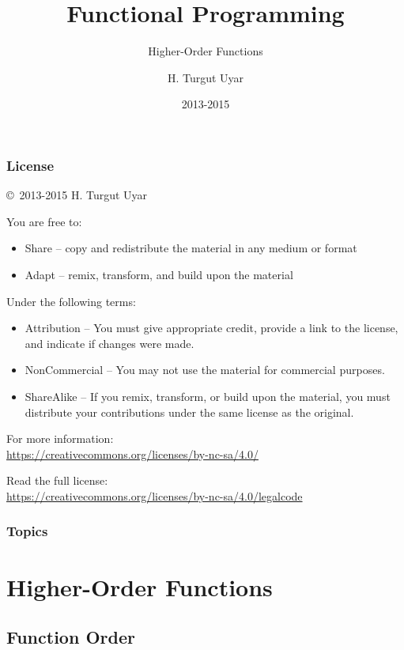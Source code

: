\documentclass[dvipsnames]{beamer}
\title{Functional Programming}
\subtitle{Higher-Order Functions}
\author{H. Turgut Uyar}
\date{2013-2015}
\theoremstyle{plain}
\begin{document}
\begin{frame}
  \titlepage
\end{frame}

\begin{frame}
  \frametitle{License}

  \hfill
  \copyright~2013-2015 H. Turgut Uyar

  \vfill
  \begin{footnotesize}
    You are free to:
    \begin{itemize}
      \itemsep0em
      \item Share -- copy and redistribute the material in any medium or format
      \item Adapt -- remix, transform, and build upon the material
    \end{itemize}

    Under the following terms:
    \begin{itemize}
      \itemsep0em
      \item Attribution -- You must give appropriate credit, provide a link to
        the license, and indicate if changes were made.

      \item NonCommercial -- You may not use the material for commercial
        purposes.

      \item ShareAlike -- If you remix, transform, or build upon the material,
        you must distribute your contributions under the same license as the
        original.
    \end{itemize}

    For more information:\\
    \url{https://creativecommons.org/licenses/by-nc-sa/4.0/}

    \smallskip
    Read the full license:\\
    \url{https://creativecommons.org/licenses/by-nc-sa/4.0/legalcode}
  \end{footnotesize}
\end{frame}

\begin{frame}
  \frametitle{Topics}
  \tableofcontents
\end{frame}

\section{Higher-Order Functions}

\subsection{Function Order}
\end{document}
